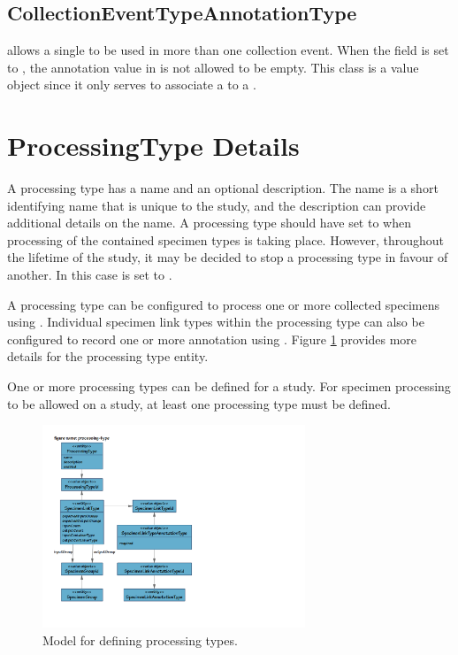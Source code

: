 \subsection*{CollectionEventTypeAnnotationType}
 allows a single
 to be used in more than one
collection event. When the  field is set to ,
the annotation value in  is not allowed
to be empty. This class is a value object since it only serves to associate a
 to a
.

\section{ProcessingType Details}
\label{sec:processing-type}

A processing type has a name and an optional description. The name is a short
identifying name that is unique to the study, and the description can provide
additional details on the name. A processing type should have 
set to  when processing of the contained specimen types is taking
place. However, throughout the lifetime of the study, it may be decided to stop
a processing type in favour of another. In this case  is set to
.

A processing type can be configured to process one or more collected specimens
using . Individual specimen link types within the
processing type can also be configured to record one or more annotation using
. Figure \ref{fig:processing-type}
provides more details for the processing type entity.

One or more processing types can be defined for a study. For specimen
processing to be allowed on a study, at least one processing type must be
defined.

\begin{figure}[H]
  \centering
  \includegraphics[trim={10mm 26mm 120mm 18mm}, clip,
    width=0.7\textwidth]{images/processing-type}
  \caption{Model for defining processing types.}
  \label{fig:processing-type}
\end{figure}

